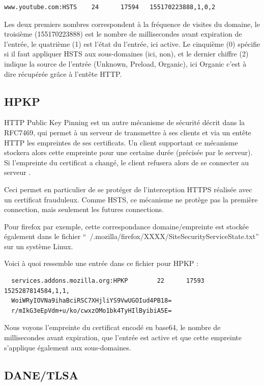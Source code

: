 \begin{verbatim}
www.youtube.com:HSTS    24      17594   155170223888,1,0,2
\end{verbatim}

Les deux premiers nombres correspondent à la fréquence de visites du domaine, le troisième (155170223888) est le nombre de millisecondes avant expiration de l'entrée, le quatrième (1) est l'état du l'entrée, ici active. Le cinquième (0) spécifie si il faut appliquer HSTS aux sous-domaines (ici, non), et le dernier chiffre (2) indique la source de l'entrée (Unknown, Preload, Organic), ici Organic c'est à dire récupérée grâce à l'entête HTTP.

\subsection{HPKP}

HTTP Public Key Pinning est un autre mécanisme de sécurité décrit dans la RFC7469, qui permet à un serveur de transmettre à ses clients et via un entête HTTP les empreintes de ses certificats. Un client supportant ce mécanisme stockera alors cette empreinte pour une certaine durée (précisée par le serveur). Si l'empreinte du certificat a changé, le client refusera alors de se connecter au serveur \cite{hpkp}.

Ceci permet en particulier de se protéger de l'interception HTTPS réalisée avec un certificat frauduleux. Comme HSTS, ce mécanisme ne protège pas la première connection, mais seulement les futures connections.

Pour firefox par exemple, cette correspondance domaine/empreinte est stockée également dans le fichier ``~/.mozilla/firefox/XXXX/SiteSecurityServiceState.txt'' sur un système Linux.

Voici à quoi ressemble une entrée dans ce fichier pour HPKP :

\begin{verbatim}
  services.addons.mozilla.org:HPKP        22      17593   1525287814584,1,1,
  WoiWRyIOVNa9ihaBciRSC7XHjliYS9VwUGOIud4PB18=
  r/mIkG3eEpVdm+u/ko/cwxzOMo1bk4TyHIlByibiA5E=
\end{verbatim}

Nous voyons l'empreinte du certificat encodé en base64, le nombre de millisecondes avant expiration, que l'entrée est active et que cette empreinte s'applique également aux sous-domaines.

\subsection{DANE/TLSA}
